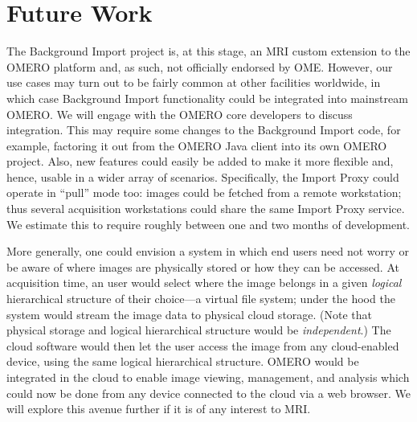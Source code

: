 \section{Future Work}

The Background Import project is, at this stage, an MRI custom extension to the OMERO
platform and, as such, not officially endorsed by OME. However, our use cases may turn 
out to be fairly common at other facilities worldwide, in which case Background Import
functionality could be integrated into mainstream OMERO. We will engage with the OMERO
core developers to discuss integration. 
This may require some changes to the Background Import code, for example, factoring it
out from the OMERO Java client into its own OMERO project. 
Also, new features could easily be added to make it more flexible and, hence, usable 
in a wider array of scenarios. Specifically, the Import Proxy could operate in ``pull''
mode too: images could be fetched from a remote workstation; thus several acquisition
workstations could share the same Import Proxy service. We estimate this to require 
roughly between one and two months of development.

More generally, one could envision a system in which end users need not worry or be
aware of where images are physically stored or how they can be accessed.
At acquisition time, an user would select where the image belongs in a given \emph{
logical} hierarchical structure of their choice---a virtual file system; under the 
hood the system would stream the image data to physical cloud storage. (Note that
physical storage and logical hierarchical structure would be \emph{independent}.)
The cloud software would then let the user access the image from any cloud-enabled
device, using the same logical hierarchical structure. OMERO would be integrated in
the cloud to enable image viewing, management, and analysis which could now be done
from any device connected to the cloud via a web browser.
We will explore this avenue further if it is of any interest to MRI.
